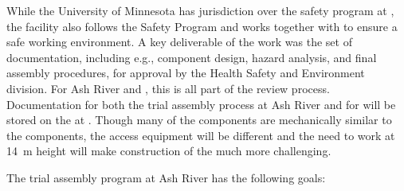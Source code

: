 While the University of Minnesota has jurisdiction over the safety program at , the facility also follows the  Safety Program and works together with  to ensure a safe working environment.  
A key deliverable of the  work was the set of documentation, including e.g.,   
component design,  hazard analysis, and final assembly procedures, for approval by the  Health Safety and Environment division. 
For Ash River and , this is all part of the  review process. 
Documentation for both the trial assembly process at Ash River and for  will be stored on the  at . 
Though many of the  components are mechanically similar to the  components, the access equipment will be different and the need to work at \SI{14}{m} height will make construction of the  much more challenging.  


The   trial assembly program at Ash River has the following goals:

